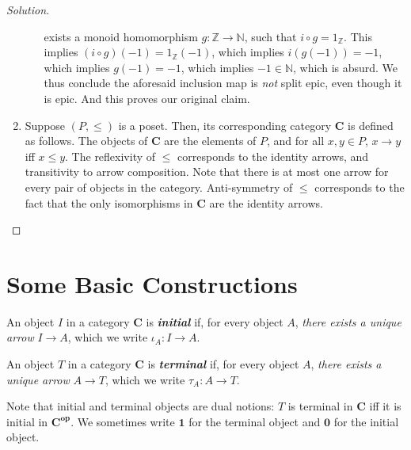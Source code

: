 \documentclass[]{amsbook}
\newcommand{\catname}[1]{\mathbf{#1}}
\newcommand{\N}{\mathbb{N}}
\newcommand{\Z}{\mathbb{Z}}
\newcommand{\0}{\mathbf{0}}
\newcommand{\1}{\mathbf{1}}
\newenvironment{solution}
    {\begin{proof}[Solution]}{\end{proof}}
\begin{document}
\begin{solution}
\begin{enumerate}
\begin{itemize}
            exists a monoid homomorphism $g: \Z \to \N$, such that $i \circ g =
            1_{\Z}$. This implies $(i \circ g)(-1) = 1_{\Z}(-1)$, which implies
            $i(g(-1)) = -1$, which implies $g(-1) = -1$, which implies $-1 \in
            \N$, which is absurd. We thus conclude the aforesaid inclusion map
            is \emph{not} split epic, even though it is epic. And this proves
            our original claim.
        \end{itemize}
    \item Suppose $(P, \le)$ is a poset. Then, its corresponding category
    $\catname{C}$ is defined as follows. The objects of $\catname{C}$ are the
    elements of $P$, and for all $x, y \in P$, $x \to y$ iff $x \le y$. The
    reflexivity of $\le$ corresponds to the identity arrows, and transitivity
    to arrow composition. Note that there is at most one arrow for every pair
    of objects in the category. Anti-symmetry of $\le$ corresponds to the fact
    that the only isomorphisms in $\catname{C}$ are the identity arrows.
    \end{enumerate}
\end{solution}

\section{Some Basic Constructions}
An object $I$ in a category $\catname{C}$ is \emph{\textbf{initial}} if, for
every object $A$, \emph{there exists a unique arrow} $I \to A$, which we write
$\iota_{A}: I \to A$.

An object $T$ in a category $\catname{C}$ is \emph{\textbf{terminal}} if, for
every object $A$, \emph{there exists a unique arrow} $A \to T$, which we write
$\tau_{A}: A \to T$.

Note that initial and terminal objects are dual notions: $T$ is terminal in
$\catname{C}$ iff it is initial in $\catname{C}^{\mathbf{op}}$. We sometimes
write $\1$ for the terminal object and $\0$ for the initial object.
\end{document}
